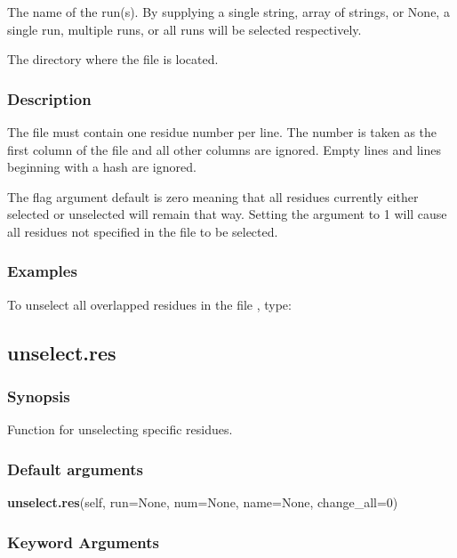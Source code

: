   The name of the run(s).  By supplying a single string, array of strings, or None, a single run, multiple runs, or all runs will be selected respectively.

  The directory where the file is located.


\subsubsection{Description}

The file must contain one residue number per line.  The number is taken as the first column
of the file and all other columns are ignored.  Empty lines and lines beginning with a hash
are ignored.

The 
 flag argument default is zero meaning that all residues currently either
selected or unselected will remain that way.  Setting the argument to 1 will cause all
residues not specified in the file to be selected.


\subsubsection{Examples}

To unselect all overlapped residues in the file 
, type:





\newpage

\subsection{unselect.res}


\subsubsection{Synopsis}

Function for unselecting specific residues.

\subsubsection{Default arguments}

\textsf{\textbf{unselect.res}(self, run=None, num=None, name=None, change\_all=0)}


\subsubsection{Keyword Arguments}


